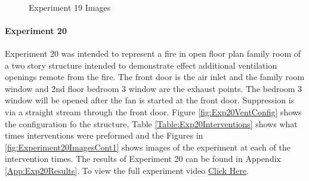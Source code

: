 \documentclass{article}
\begin{document}
\begin{figure}[H]
	\ContinuedFloat 
	\centering 
	 \ 
	\caption{Experiment 19 Images}
	\label{fig:Experiment19ImagesCont3} 
\end{figure}

\paragraph{Experiment 20}\mbox{}

Experiment 20 was intended to represent a fire in open floor plan family room of a two story structure intended to demonstrate effect additional ventilation openings remote from the fire. The front door is the air inlet and the family room window and 2nd floor bedroom 3 window are the exhaust points. The bedroom 3 window will be opened after the fan is started at the front door. Suppression is via a straight stream through the front door. Figure \ref{fig:Exp20VentConfig} shows the configuration fo the structure, Table \ref{Table:Exp20Interventions} shows what times interventions were preformed and the Figures in \ref{fig:Experiment20ImagesCont1} shows images of the experiment at each of the intervention times. The results of Experiment 20 can be found in Appendix \ref{App:Exp20Results}. To view the full experiment video \href{https://youtu.be/lMBMZXApou4}{Click Here}.
\end{document}
